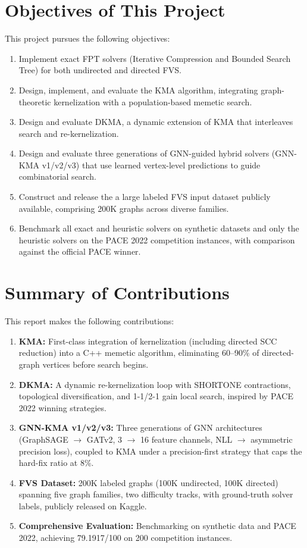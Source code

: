 \documentclass[10pt,a4paper]{report}
\theoremstyle{definition}
\newcommand{\fvs}{\textsc{FVS}}
\newcommand{\kma}{\textsc{KMA}}
\newcommand{\dkma}{\textsc{DKMA}}
\newcommand{\gnnkma}{\textsc{GNN-KMA}}
\begin{document}
\section{Objectives of This Project}

This project pursues the following objectives:

\begin{enumerate}
	\item Implement exact FPT solvers (Iterative Compression and Bounded Search Tree) for both undirected and directed \fvs{}.
	\item Design, implement, and evaluate the \kma{} algorithm, integrating graph-theoretic kernelization with a population-based memetic search.
	\item Design and evaluate \dkma{}, a dynamic extension of \kma{} that interleaves search and re-kernelization.
	\item Design and evaluate three generations of GNN-guided hybrid solvers (\gnnkma{} v1/v2/v3) that use learned vertex-level predictions to guide combinatorial search.
	\item Construct and release the a large labeled \fvs{} input dataset publicly available, comprising 200K graphs across diverse families.
	\item Benchmark all exact and heuristic solvers on synthetic datasets and only the heuristic solvers on the PACE 2022 competition instances, with comparison against the official PACE winner.
\end{enumerate}

\section{Summary of Contributions}

This report makes the following contributions:

\begin{enumerate}
	\item \textbf{KMA:} First-class integration of kernelization (including directed SCC reduction) into a C++ memetic algorithm, eliminating 60--90\% of directed-graph vertices before search begins.
	\item \textbf{DKMA:} A dynamic re-kernelization loop with SHORTONE contractions, topological diversification, and 1-1/2-1 gain local search, inspired by PACE 2022 winning strategies.
	\item \textbf{GNN-KMA v1/v2/v3:} Three generations of GNN architectures (GraphSAGE $\to$ GATv2, 3 $\to$ 16 feature channels, NLL $\to$ asymmetric precision loss), coupled to \kma{} under a precision-first strategy that caps the hard-fix ratio at 8\%.
	\item \textbf{FVS Dataset:} 200K labeled graphs (100K undirected, 100K directed) spanning five graph families, two difficulty tracks, with ground-truth solver labels, publicly released on Kaggle.
	\item \textbf{Comprehensive Evaluation:} Benchmarking on synthetic data and PACE 2022, achieving 79.1917/100 on 200 competition instances.
\end{enumerate}
\end{document}
